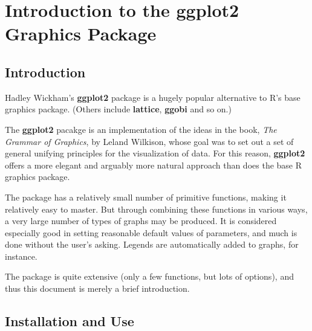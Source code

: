 
% 
% 
% 
% 
% 
% 
% 
% 
 
% 

\chapter{Introduction to the ggplot2 Graphics Package}
\label{ggplot2}

\section{Introduction}

Hadley Wickham's {\bf ggplot2} package is a hugely popular alternative to
R's base graphics package.  (Others include {\bf lattice}, {\bf ggobi}
and so on.)  

The {\bf ggplot2} pacakge is an implementation of the ideas in the book,
{\it The Grammar of Graphics}, by Leland Wilkison, whose goal was to set
out a set of general unifying principles for the visualization of data.
For this reason, {\bf ggplot2} offers a more elegant and arguably more
natural approach than does the base R graphics package.

The package has a relatively small number of primitive functions, making
it relatively easy to master.  But through combining these functions in
various ways, a very large number of types of graphs may be produced.
It is considered especially good in setting reasonable default values of
parameters, and much is done without the user's asking.  Legends are
automatically added to graphs, for instance.

The package is quite extensive (only a few functions, but lots of
options), and thus this document is merely a brief introduction.

\section{Installation and Use}

